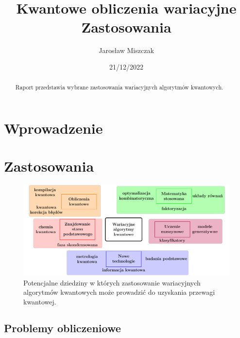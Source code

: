 \documentclass[a4paper,11pt]{article}
\begin{document}
\title{Kwantowe obliczenia wariacyjne\\ {\normalsize Zastosowania}}

\author{Jarosław Miszczak}
\date{21/12/2022}

\maketitle

\begin{abstract}
Raport przedstawia wybrane zastosowania wariacyjnych algorytmów kwantowych. 
\end{abstract}


\hypertarget{wprowadzenie}{%
\section{Wprowadzenie}\label{wprowadzenie}}


\newpage 

\hypertarget{zastosowania}{%
	\section{Zastosowania}\label{zastosowania}}


\begin{figure}[ht!]
	\centering
	\includegraphics[width=\textwidth]{vqa-applications-pl}
	\caption{Potencjalne dziedziny w których zastosowanie wariacyjnych algorytmów kwantowych może prowadzić do uzyskania przewagi kwantowej.}
\end{figure}

\hypertarget{matematyczne}{%
	\subsection{Problemy obliczeniowe}\label{matematyczne}}
\end{document}
